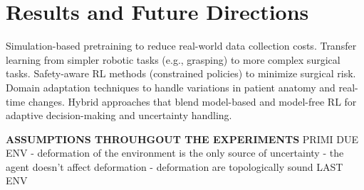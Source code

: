 
\chapter{Results and Future Directions}

Simulation-based pretraining to reduce real-world data collection costs.
Transfer learning from simpler robotic tasks (e.g., grasping) to more complex surgical tasks.
Safety-aware RL methods (constrained policies) to minimize surgical risk.
Domain adaptation techniques to handle variations in patient anatomy and real-time changes.
Hybrid approaches that blend model-based and model-free RL for adaptive decision-making and uncertainty handling.



\textbf{ASSUMPTIONS THROUHGOUT THE EXPERIMENTS}
PRIMI DUE ENV
- deformation of the environment is the only source of uncertainty
- the agent doesn't affect deformation 
- deformation are topologically sound
LAST ENV

